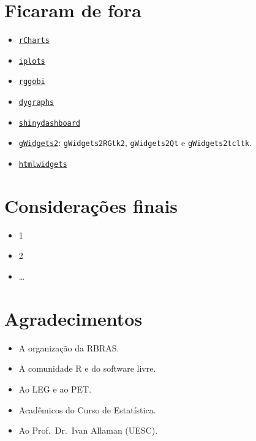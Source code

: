 \section{Ficaram de fora}

\begin{frame}

  \begin{itemize}
  \item 
    \href{http://ramnathv.github.io/rCharts/}{\texttt{rCharts}}
  \item
    \href{http://cran.r-project.org/web/packages/iplots/index.html}{\texttt{iplots}}
  \item
    \href{http://cran.r-project.org/web/packages/rggobi/index.html}{\texttt{rggobi}}
  \item
    \href{https://rstudio.github.io/dygraphs/index.html}{\texttt{dygraphs}}
  \item
    \href{http://rstudio.github.io/shinydashboard/index.html}{\texttt{shinydashboard}}
  \item
    \href{https://cran.r-project.org/web/packages/gWidgets2/index.html}{\texttt{gWidgets2}}:
    \texttt{gWidgets2RGtk2}, \texttt{gWidgets2Qt} e \texttt{gWidgets2tcltk}.
  \item
    \href{http://www.htmlwidgets.org/index.html}{\texttt{htmlwidgets}}
  \end{itemize}

\end{frame}

\section{Considerações finais}

\begin{frame}

  \begin{itemize}
  \item 1
  \item 2
  \item \ldots{}
  \end{itemize}

\end{frame}

\section{Agradecimentos}

\begin{frame}

  \begin{itemize}
  \item A organização da RBRAS.
  \item A comunidade R e do software livre.
  \item Ao LEG e ao PET.
  \item Acadêmicos do Curso de Estatística.
  \item Ao Prof.~Dr.~Ivan Allaman (UESC).
  \end{itemize}

\end{frame}

